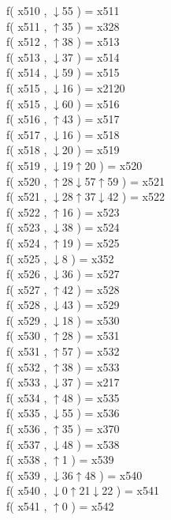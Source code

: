 f( x510 , $\downarrow$55 ) = x511 \\
f( x511 , $\uparrow$35 ) = x328 \\
f( x512 , $\uparrow$38 ) = x513 \\
f( x513 , $\downarrow$37 ) = x514 \\
f( x514 , $\downarrow$59 ) = x515 \\
f( x515 , $\downarrow$16 ) = x2120 \\
f( x515 , $\downarrow$60 ) = x516 \\
f( x516 , $\uparrow$43 ) = x517 \\
f( x517 , $\downarrow$16 ) = x518 \\
f( x518 , $\downarrow$20 ) = x519 \\
f( x519 , $\downarrow$19$\uparrow$20 ) = x520 \\
f( x520 , $\uparrow$28$\downarrow$57$\uparrow$59 ) = x521 \\
f( x521 , $\downarrow$28$\uparrow$37$\downarrow$42 ) = x522 \\
f( x522 , $\uparrow$16 ) = x523 \\
f( x523 , $\downarrow$38 ) = x524 \\
f( x524 , $\uparrow$19 ) = x525 \\
f( x525 , $\downarrow$8 ) = x352 \\
f( x526 , $\downarrow$36 ) = x527 \\
f( x527 , $\uparrow$42 ) = x528 \\
f( x528 , $\downarrow$43 ) = x529 \\
f( x529 , $\downarrow$18 ) = x530 \\
f( x530 , $\uparrow$28 ) = x531 \\
f( x531 , $\uparrow$57 ) = x532 \\
f( x532 , $\uparrow$38 ) = x533 \\
f( x533 , $\downarrow$37 ) = x217 \\
f( x534 , $\uparrow$48 ) = x535 \\
f( x535 , $\downarrow$55 ) = x536 \\
f( x536 , $\uparrow$35 ) = x370 \\
f( x537 , $\downarrow$48 ) = x538 \\
f( x538 , $\uparrow$1 ) = x539 \\
f( x539 , $\downarrow$36$\uparrow$48 ) = x540 \\
f( x540 , $\downarrow$0$\uparrow$21$\downarrow$22 ) = x541 \\
f( x541 , $\uparrow$0 ) = x542 \\
